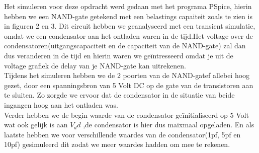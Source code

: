 \documentclass{article}
\begin{document}
Het simuleren voor deze opdracht werd gedaan met het programa PSpice, hierin hebben we een NAND-gate getekend met een belastings capaiteit zoals te zien is in figuren 2 en 3. Dit circuit hebben we geanalyseerd met een transient simulatie, omdat we een condensator aan het ontladen waren in de tijd.Het voltage over de condensatoren(uitgangscapaciteit en de capaciteit van de NAND-gate) zal dan dus veranderen in de tijd en hierin waren we geïntresseerd omdat je uit de voltage grafiek de delay van je NAND-gate kan uitrekenen.\\
Tijdens het simuleren hebben we de 2 poorten van de NAND-gatef allebei hoog gezet, door een spanningsbron van 5 Volt DC op de gate van de transistoren aan te sluiten. Zo zorgde we ervoor dat de condensator in de situatie van beide ingangen hoog aan het ontladen was.\\
Verder hebben we de begin waarde van de condensator geïnitialiseerd  op 5 Volt wat ook gelijk is aan $V_dd$ ,de condensator is hier dus maixmaal opgeladen. En als laatste hebben we voor verschillende waardes van de condensator(1pf, 5pf en 10pf) gesimuleerd dit zodat we meer waardes hadden om mee te rekenen.
\end{document}
